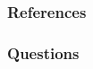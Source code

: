 \documentclass[t,12pt,numbers,fleqn]{beamer}
\begin{document}

\begin{frame}
\frametitle{References}

\printbibliography[heading=none]{}

\end{frame}


\begin{frame}
\frametitle{Questions}

\end{frame}

\end{document}
